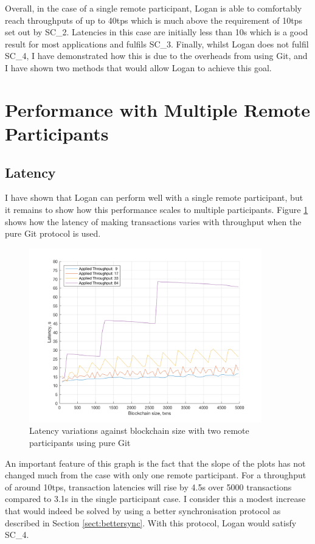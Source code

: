 \documentclass[12pt,a4paper,twoside,openright]{report}
\begin{document}
	Overall, in the case of a single remote participant, Logan is able to comfortably reach throughputs of up to 40tps which is much above the requirement of 10tps set out by SC\_2. 
	Latencies in this case are initially less than 10s which is a good result for most applications and fulfils SC\_3.
	Finally, whilst Logan does not fulfil SC\_4, I have demonstrated how this is due to the overheads from using Git, and I have shown two methods that would allow Logan to achieve this goal.

	\section{Performance with Multiple Remote Participants}
	\subsection{Latency}
	I have shown that Logan can perform well with a single remote participant, but it remains to show how this performance scales to multiple participants. 
	Figure \ref{figs:tworems} shows how the latency of making transactions varies with throughput when the pure Git protocol is used.
	\begin{figure}
		\centering
		\includegraphics[width=0.9\textwidth]{figs/2latencies_sizes_throughputs.png}
		\caption{Latency variations against blockchain size with two remote participants using pure Git}
		\label{figs:tworems}
	\end{figure}
	An important feature of this graph is the fact that the slope of the plots has not changed much from the case with only one remote participant.
	For a throughput of around 10tps, transaction latencies will rise by 4.5s over 5000 transactions compared to 3.1s in the single participant case.
	I consider this a modest increase that would indeed be solved by using a better synchronisation protocol as described in Section \ref{sect:bettersync}. 
	With this protocol, Logan would satisfy SC\_4. \\
\end{document}
